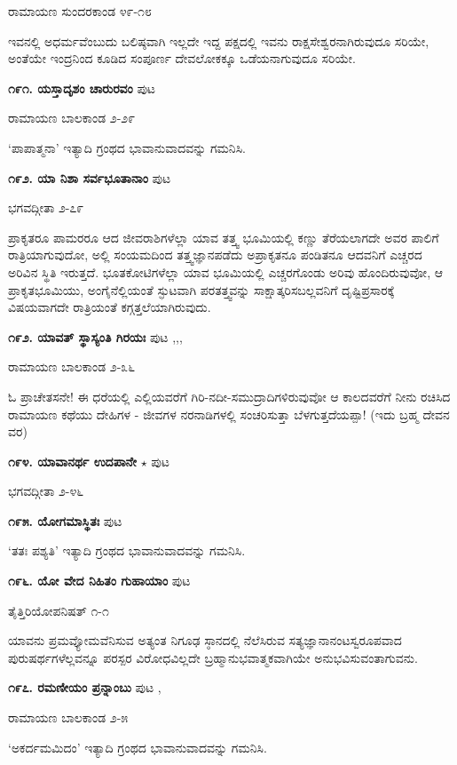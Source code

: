 \hfill ರಾಮಾಯಣ ಸುಂದರಕಾಂಡ ೪೯-೧೮

ಇವನಲ್ಲಿ ಅಧರ್ಮವೆಂಬುದು ಬಲಿಷ್ಠವಾಗಿ ಇಲ್ಲದೇ ಇದ್ದ ಪಕ್ಷದಲ್ಲಿ ಇವನು ರಾಕ್ಷಸೇಶ್ವರನಾಗಿರುವುದೂ ಸರಿಯೇ, ಅಂತೆಯೇ ಇಂದ್ರನಿಂದ ಕೂಡಿದ ಸಂಪೂರ್ಣ ದೇವಲೋಕಕ್ಕೂ ಒಡೆಯನಾಗುವುದೂ ಸರಿಯೇ.

\medskip
\noindent\textbf{೧೯೧. ಯಸ್ತಾದೃಶಂ ಚಾರುರವಂ} \hfill ಪುಟ \pageref{250}

\hfill ರಾಮಾಯಣ ಬಾಲಕಾಂಡ ೨-೨೯

`ಪಾಪಾತ್ಮನಾ' ಇತ್ಯಾದಿ ಗ್ರಂಥದ ಭಾವಾನುವಾದವನ್ನು ಗಮನಿಸಿ.

\medskip
\noindent\textbf{೧೯೨. ಯಾ ನಿಶಾ ಸರ್ವಭೂತಾನಾಂ} \hfill ಪುಟ \pageref{138}

\hfill ಭಗವದ್ಗೀತಾ ೨-೭೯

ಪ್ರಾಕೃತರೂ ಪಾಮರರೂ ಆದ ಜೀವರಾಶಿಗಳೆಲ್ಲಾ ಯಾವ ತತ್ತ್ವ ಭೂಮಿಯಲ್ಲಿ ಕಣ್ಣು ತೆರೆಯಲಾಗದೇ ಅವರ ಪಾಲಿಗೆ ರಾತ್ರಿಯಾಗುವುದೋ, ಅಲ್ಲಿ ಸಂಯಮದಿಂದ ತತ್ತ್ವಜ್ಞಾನಪಡೆದು ಅಪ್ರಾಕೃತನೂ ಪಂಡಿತನೂ ಆದವನಿಗೆ ಎಚ್ಚರದ ಅರಿವಿನ ಸ್ಥಿತಿ ಇರುತ್ತದೆ. ಭೂತಕೋಟಿಗಳೆಲ್ಲಾ ಯಾವ ಭೂಮಿಯಲ್ಲಿ ಎಚ್ಚರಗೊಂಡು ಅರಿವು ಹೊಂದಿರುವುವೋ, ಆ ಪ್ರಾಕೃತಭೂಮಿಯು, ಅಂಗೈನೆಲ್ಲಿಯಂತೆ ಸ್ಫುಟವಾಗಿ ಪರತತ್ತ್ವವನ್ನು ಸಾಕ್ಷಾತ್ಕರಿಸಬಲ್ಲವನಿಗೆ ದೃಷ್ಟಿಪ್ರಸಾರಕ್ಕೆ ವಿಷಯವಾಗದೇ ರಾತ್ರಿಯಂತೆ ಕಗ್ಗತ್ತಲೆಯಾಗಿರುವುದು.

\medskip
\noindent\textbf{೧೯೨. ಯಾವತ್ ಸ್ಥಾಸ್ಯಂತಿ ಗಿರಯಃ} \hfill ಪುಟ \pageref{158b},\pageref{166},\pageref{208b},\pageref{210b}

\hfill ರಾಮಾಯಣ ಬಾಲಕಾಂಡ ೨-೩೬

ಓ ಪ್ರಾಚೇತಸನೇ! ಈ ಧರೆಯಲ್ಲಿ ಎಲ್ಲಿಯವರೆಗೆ ಗಿರಿ-ನದೀ-ಸಮುದ್ರಾದಿಗಳಿರುವುವೋ ಆ ಕಾಲದವರೆಗೆ ನೀನು ರಚಿಸಿದ ರಾಮಾಯಣ ಕಥೆಯು ದೇಹಿಗಳ - ಜೀವಗಳ ನರನಾಡಿಗಳಲ್ಲಿ ಸಂಚರಿಸುತ್ತಾ ಬೆಳಗುತ್ತದೆಯಪ್ಪಾ! (ಇದು ಬ್ರಹ್ಮ ದೇವನ ವರ)

\medskip
\noindent\textbf{೧೯೪. ಯಾವಾನರ್ಥ ಉದಪಾನೇ} $\star$ \hfill ಪುಟ \pageref{14}

\hfill ಭಗವದ್ಗೀತಾ ೨-೪೬

\medskip
\noindent\textbf{೧೯೫. ಯೋಗಮಾಸ್ಥಿತಃ} \hfill ಪುಟ \pageref{249b}

\hfill `ತತಃ ಪಶ್ಯತಿ' ಇತ್ಯಾದಿ ಗ್ರಂಥದ ಭಾವಾನುವಾದವನ್ನು ಗಮನಿಸಿ.

\medskip
\noindent\textbf{೧೯೬. ಯೋ ವೇದ ನಿಹಿತಂ ಗುಹಾಯಾಂ} \hfill ಪುಟ \pageref{108}

\hfill ತೈತ್ತಿರಿಯೋಪನಿಷತ್ ೧-೧

ಯಾವನು ಪ್ರಮವ್ಯೋಮವೆನಿಸುವ ಅತ್ಯಂತ ನಿಗೂಢ ಸ್ಠಾನದಲ್ಲಿ ನೆಲೆಸಿರುವ ಸತ್ಯಜ್ಞಾನಾನಂಟಸ್ವರೂಪವಾದ ಪುರುಷರ್ಥಗಳೆಲ್ಲವನ್ನೂ ಪರಸ್ಪರ ವಿರೋಧವಿಲ್ಲದೇ ಬ್ರಹ್ಮಾನುಭವಾತ್ಮಕವಾಗಿಯೇ ಅನುಭವಿಸುವಂತಾಗುವನು.

\medskip
\noindent\textbf{೧೯೭. ರಮಣೀಯಂ ಪ್ರನ್ನಾಂಬು} \hfill ಪುಟ \pageref{165c},\pageref{211f}

\hfill ರಾಮಾಯಣ ಬಾಲಕಾಂಡ ೨-೫

`ಅಕರ್ದಮಮಿದಂ' ಇತ್ಯಾದಿ ಗ್ರಂಥದ ಭಾವಾನುವಾದವನ್ನು ಗಮನಿಸಿ.

